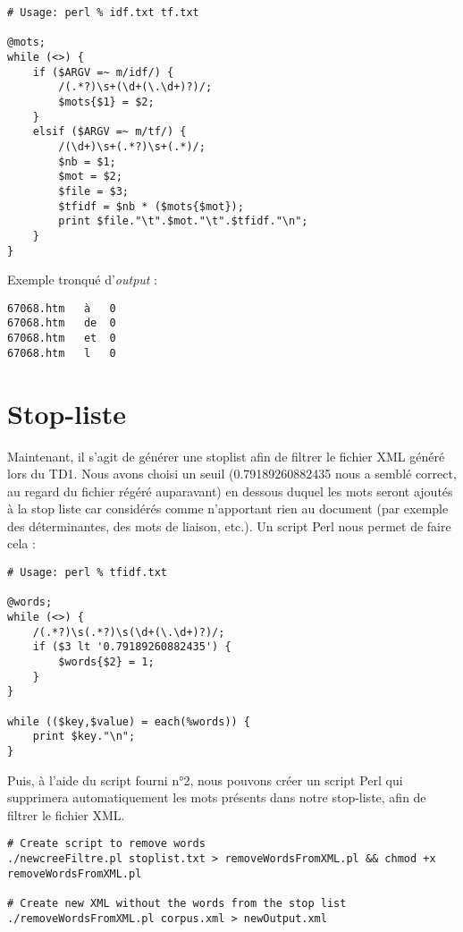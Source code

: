 \begin{lstlisting}
# Usage: perl % idf.txt tf.txt

@mots;
while (<>) {
    if ($ARGV =~ m/idf/) {
        /(.*?)\s+(\d+(\.\d+)?)/;
        $mots{$1} = $2;
    }
    elsif ($ARGV =~ m/tf/) {
        /(\d+)\s+(.*?)\s+(.*)/;
        $nb = $1;
        $mot = $2;
        $file = $3;
        $tfidf = $nb * ($mots{$mot});
        print $file."\t".$mot."\t".$tfidf."\n";
    }
}
\end{lstlisting}
\fakeshell

\medskip

\noindent Exemple tronqué d'\textit{output} :
\begin{lstlisting}
67068.htm	à	0
67068.htm	de	0
67068.htm	et	0
67068.htm	l	0
\end{lstlisting}


\section{Stop-liste}

Maintenant, il s'agit de générer une stoplist afin de filtrer le fichier XML généré lors du TD1. Nous avons choisi un seuil (0.79189260882435 nous a semblé correct, au regard du fichier régéré auparavant) en dessous duquel les mots seront ajoutés à la stop liste car considérés comme n'apportant rien au document (par exemple des déterminantes, des mots de liaison, etc.). Un script Perl nous permet de faire cela :

\perl
\begin{lstlisting}
# Usage: perl % tfidf.txt

@words;
while (<>) {
    /(.*?)\s(.*?)\s(\d+(\.\d+)?)/;
    if ($3 lt '0.79189260882435') {
        $words{$2} = 1;
    }
}

while (($key,$value) = each(%words)) {
    print $key."\n";
}
\end{lstlisting}

Puis, à l'aide du script fourni n°2, nous pouvons créer un script Perl qui supprimera automatiquement les mots présents dans notre stop-liste, afin de filtrer le fichier XML.

\fakeshell
\begin{lstlisting}
# Create script to remove words
./newcreeFiltre.pl stoplist.txt > removeWordsFromXML.pl && chmod +x removeWordsFromXML.pl

# Create new XML without the words from the stop list
./removeWordsFromXML.pl corpus.xml > newOutput.xml
\end{lstlisting}

